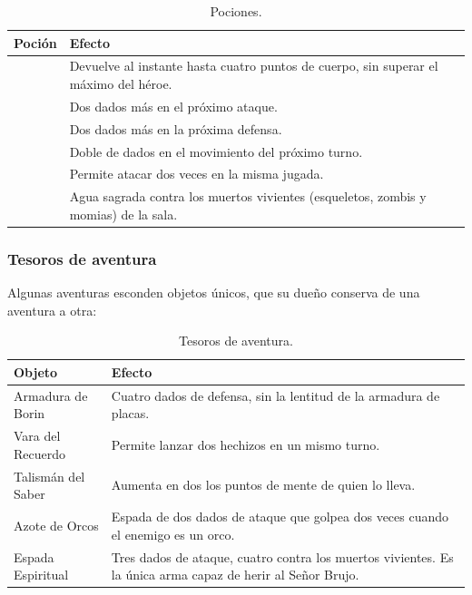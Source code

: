 \begin{table}[H]\centering\small
\begin{tabularx}{\linewidth}{@{}lL@{}}
\toprule
\textbf{Poción} & \textbf{Efecto}\\
\midrule
{}    & Devuelve al instante hasta cuatro puntos de cuerpo,
                     sin superar el máximo del héroe.\\
      & Dos dados más en el próximo ataque.\\
 & Dos dados más en la próxima defensa.\\
   & Doble de dados en el movimiento del próximo turno.\\
     & Permite atacar dos veces en la misma jugada.\\
  & Agua sagrada contra los muertos vivientes
                     (esqueletos, zombis y momias) de la sala.\\
\bottomrule
\end{tabularx}
\caption{Pociones.}
\end{table}

\subsubsection*{Tesoros de aventura}

Algunas aventuras esconden objetos únicos, que su dueño conserva de una
aventura a otra:

\begin{table}[H]\centering\small
\begin{tabularx}{\linewidth}{@{}lL@{}}
\toprule
\textbf{Objeto} & \textbf{Efecto}\\
\midrule
Armadura de Borin   & Cuatro dados de defensa, sin la lentitud de la
                      armadura de placas.\\
Vara del Recuerdo   & Permite lanzar dos hechizos en un mismo turno.\\
Talismán del Saber  & Aumenta en dos los puntos de mente de quien lo
                      lleva.\\
Azote de Orcos      & Espada de dos dados de ataque que golpea dos veces
                      cuando el enemigo es un orco.\\
Espada Espiritual   & Tres dados de ataque, cuatro contra los muertos
                      vivientes. Es la única arma capaz de herir al Señor
                      Brujo.\\
\bottomrule
\end{tabularx}
\caption{Tesoros de aventura.}
\end{table}

